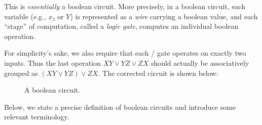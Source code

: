 {  This is \emph{essentially} a boolean circuit.  More precisely, in a boolean
  circuit, each variable (e.g., \(x₂\) or \(Y\)) is represented as a \emph{wire}
  carrying a boolean value, and each ``stage'' of computation, called a
  \emph{logic gate}, computes an individual boolean operation.

  For simplicity's sake, we also require that each \AND/\OR{} gate operates on
  exactly two inputs.  Thus the last \OR{} operation \(XY∨YZ∨ZX\) should
  actually be associatively grouped as \((XY∨YZ)∨ZX\).  The corrected circuit
  is shown below:

  \begin{figure}[H]
  \begin{center}
    \caption{A boolean circuit.}
  \end{center}
\end{figure}

}


Below, we state a precise definition of boolean circuits and introduce some
relevant terminology.


